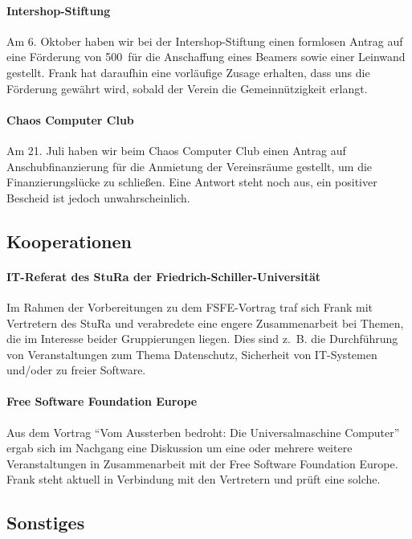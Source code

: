 \documentclass[10pt,DIV16]{scrartcl}
\begin{document}
\paragraph{Intershop-Stiftung}

Am 6. Oktober haben wir bei der Intershop-Stiftung einen formlosen
Antrag auf eine Förderung von 500\EUR\ für die Anschaffung eines
Beamers sowie einer Leinwand gestellt.  Frank hat daraufhin eine
vorläufige Zusage erhalten, dass uns die Förderung gewährt wird,
sobald der Verein die Gemeinnützigkeit erlangt.

\paragraph{Chaos Computer Club}

Am 21. Juli haben wir beim Chaos Computer Club einen Antrag auf
Anschubfinanzierung für die Anmietung der Vereinsräume gestellt, um die
Finanzierungslücke zu schließen. Eine Antwort steht noch aus, ein positiver
Bescheid ist jedoch unwahrscheinlich.


\subsection{Kooperationen}

\paragraph{IT-Referat des StuRa der Friedrich-Schiller-Universität}

Im Rahmen der Vorbereitungen zu dem FSFE-Vortrag traf sich Frank mit
Vertretern des StuRa und verabredete eine engere Zusammenarbeit bei
Themen, die im Interesse beider Gruppierungen liegen. Dies sind z.\,
B. die Durchführung von Veranstaltungen zum Thema Datenschutz,
Sicherheit von IT-Systemen und/oder zu freier Software.

\paragraph{Free Software Foundation Europe}

Aus dem Vortrag "`Vom Aussterben bedroht: Die Universalmaschine
Computer"' ergab sich im Nachgang eine Diskussion um eine oder
mehrere weitere Veranstaltungen in Zusammenarbeit mit der Free
Software Foundation Europe. Frank steht aktuell in Verbindung mit
den Vertretern und prüft eine solche.

\subsection{Sonstiges}
\end{document}
